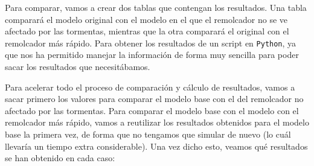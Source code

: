 \documentclass[11pt,a4paper]{article}
\begin{document}
Para comparar, vamos a crear dos tablas que contengan los resultados. Una tabla
comparará el modelo original con el modelo en el que el remolcador no se ve afectado
por las tormentas, mientras que la otra comparará el original con el remolcador
más rápido. Para obtener los resultados de un script en \texttt{Python}, ya que nos ha permitido
manejar la información de forma muy sencilla para poder sacar los resultados que
necesitábamos.

Para acelerar todo el proceso de comparación y cálculo de resultados, vamos a sacar primero
los valores para comparar el modelo base con el del remolcador no afectado por
las tormentas. Para comparar el modelo base con el modelo con el remolcador más
rápido, vamos a reutilizar los resultados obtenidos para el modelo base la primera
vez, de forma que no tengamos que simular de nuevo (lo cuál llevaría un tiempo
extra considerable). Una vez dicho esto, veamos qué resultados se han obtenido
en cada caso:

\begin{table}[H]
\centering
{}
\caption{Porcentaje de veces que un modelo es mejor que el otro. En negrita los mejores valores.}
\label{tab:porcentaje-1}
\end{table}

\begin{table}[H]
\centering
{}
\caption{Porcentaje de veces que un modelo es mejor que el otro. En negrita los mejores valores.}
\label{tab:porcentaje-2}
\end{table}
\end{document}

